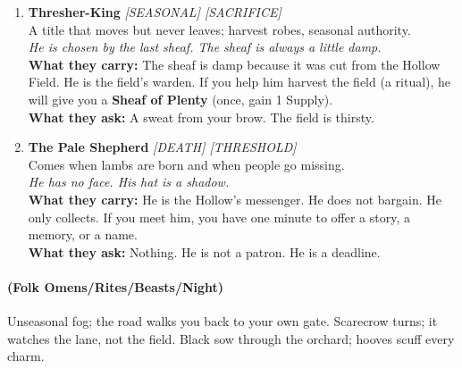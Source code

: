 \begin{enumerate}
\item[K] \textbf{Thresher-King} \hfill \textit{[SEASONAL] [SACRIFICE]} \\
  A title that moves but never leaves; harvest robes, seasonal authority. \\
  \textit{He is chosen by the last sheaf. The sheaf is always a little damp.} \\
  \textbf{What they carry:} The sheaf is damp because it was cut from the Hollow Field. He is the field's warden. If you help him harvest the field (a ritual), he will give you a \textbf{Sheaf of Plenty} (once, gain 1 Supply). \\
  \textbf{What they ask:} A sweat from your brow. The field is thirsty.

\item[A] \textbf{The Pale Shepherd} \hfill \textit{[DEATH] [THRESHOLD]} \\
  Comes when lambs are born and when people go missing. \\
  \textit{He has no face. His hat is a shadow.} \\
  \textbf{What they carry:} He is the Hollow's messenger. He does not bargain. He only collects. If you meet him, you have one minute to offer a story, a memory, or a name. \\
  \textbf{What they ask:} Nothing. He is not a patron. He is a deadline.
\end{enumerate}

\paragraph*{(Folk Omens/Rites/Beasts/Night)} Unseasonal fog; the road walks you back to your own gate. Scarecrow turns; it watches the lane, not the field. Black sow through the orchard; hooves scuff every charm.

